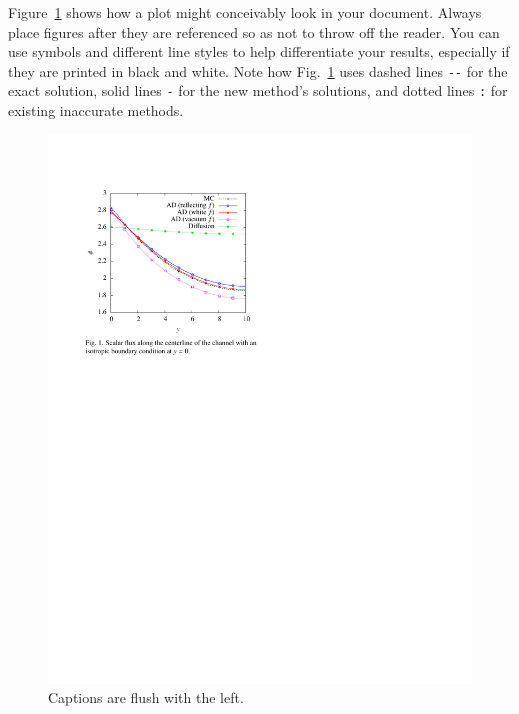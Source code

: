 \documentclass{anstrans}
\begin{document}
Figure~\ref{fig:voltage} shows how a plot might conceivably look in your
document. Always place figures after they are referenced so as not to throw
off the reader. You can use symbols and different line styles to help
differentiate your results, especially if they are printed in black and white.
Note how Fig.~\ref{fig:voltage} uses dashed lines \verb|--| for the exact
solution, solid lines \verb|-| for the new method's solutions, and dotted lines
\verb|:| for existing inaccurate methods.
\begin{figure}[ht] %
  \centering
  \includegraphics{example_figure}
  \caption{Captions are flush with the left.}
  \label{fig:voltage}
\end{figure}
\end{document}
